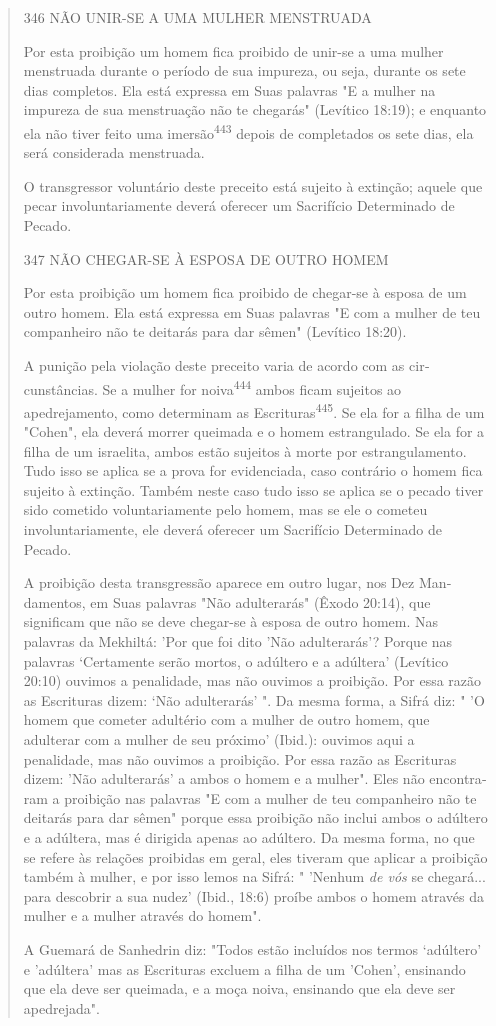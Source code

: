 \begin{quote}
346 NÃO UNIR-SE A UMA MULHER MENSTRUADA

Por esta proibição um homem fica proibido de unir-se a uma mu­lher
menstruada durante o período de sua impureza, ou seja, durante os sete
dias completos. Ela está expressa em Suas palavras "E a mulher na impureza de
sua menstruação não te chegarás" (Levítico 18:19); e enquanto ela não
tiver feito uma imersão\textsuperscript{443} depois de completados os
sete dias, ela será considerada menstruada.

O transgressor voluntário deste preceito está sujeito à extinção; aquele
que pecar involuntariamente deverá oferecer um Sacrifício Determinado de
Pecado.

347 NÃO CHEGAR-SE À ESPOSA DE OUTRO HOMEM

Por esta proibição um homem fica proibido de chegar-se à esposa de um
outro homem. Ela está expressa em Suas palavras "E com a mulher de teu
companheiro não te deitarás para dar sêmen" (Levítico 18:20).

A punição pela violação deste preceito varia de acordo com as
cir­cunstâncias. Se a mulher for noiva\textsuperscript{444} ambos ficam
sujeitos ao apedrejamen­to, como determinam as
Escrituras\textsuperscript{445}. Se ela for a filha de um "Cohen", ela
deverá morrer queimada e o homem estrangulado. Se ela for a filha de um
is­raelita, ambos estão sujeitos à morte por estrangulamento. Tudo isso
se aplica se a prova for evidenciada, caso contrário o homem fica
sujeito à extinção. Tam­bém neste caso tudo isso se aplica se o pecado
tiver sido cometido voluntaria­mente pelo homem, mas se ele o cometeu
involuntariamente, ele deverá ofere­cer um Sacrifício Determinado de
Pecado.

A proibição desta transgressão aparece em outro lugar, nos Dez
Man­damentos, em Suas palavras "Não adulterarás" (Êxodo 20:14), que
significam que não se deve chegar-se à esposa de outro homem. Nas
palavras da Mekhiltá: 'Por que foi dito 'Não adulterarás'? Porque nas
palavras `Certamente serão mor­tos, o adúltero e a adúltera' (Levítico
20:10) ouvimos a penalidade, mas não ouvimos a proibição. Por essa razão
as Escrituras dizem: `Não adulterarás' ". Da mesma forma, a Sifrá diz: "
'O homem que cometer adultério com a mulher de outro homem, que
adulterar com a mulher de seu próximo' (Ibid.): ouvi­mos aqui a
penalidade, mas não ouvimos a proibição. Por essa razão as Escritu­ras
dizem: 'Não adulterarás' a ambos o homem e a mulher". Eles não
encontra­ram a proibição nas palavras "E com a mulher de teu companheiro
não te dei­tarás para dar sêmen" porque essa proibição não inclui ambos
o adúltero e a adúltera, mas é dirigida apenas ao adúltero. Da mesma
forma, no que se refere às relações proibidas em geral, eles tiveram que
aplicar a proibição também à mulher, e por isso lemos na Sifrá: "
'Nenhum \emph{de vós} se chegará... para desco­brir a sua nudez' (Ibid.,
18:6) proíbe ambos o homem através da mulher e a mulher através do
homem".

A Guemará de Sanhedrin diz: "Todos estão incluídos nos termos `adúltero'
e 'adúltera' mas as Escrituras excluem a filha de um 'Cohen', ensi­nando
que ela deve ser queimada, e a moça noiva, ensinando que ela deve ser
apedrejada".
\end{quote}

